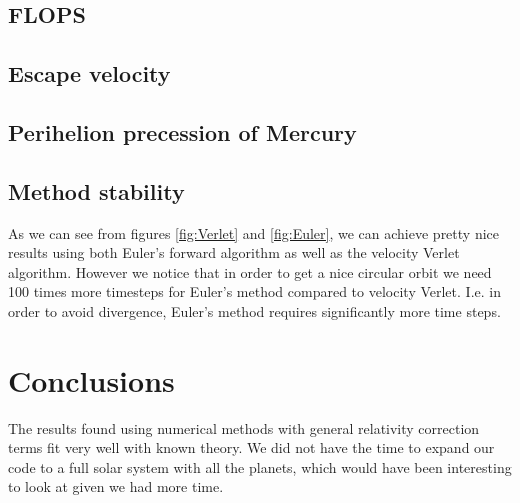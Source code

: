 \documentclass[a4paper, fontsize=11pt]{article}
\begin{document}
\cite{H-Jensen}

\subsection{FLOPS}




\subsection{Escape velocity}






\subsection{Perihelion precession of Mercury}




\subsection{Method stability} 




As we can see from figures \ref{fig:Verlet} and \ref{fig:Euler}, we can achieve pretty nice results using both Euler's forward algorithm as well as the velocity Verlet algorithm. However we notice that in order to get a nice circular orbit we need 100 times more timesteps for Euler's method compared to velocity Verlet. I.e. in order to avoid divergence, Euler's method requires significantly more time steps.



\section{Conclusions}

The results found using numerical methods with general relativity correction terms fit very well with known theory. We did not have the time to expand our code to a full solar system with all the planets, which would have been interesting to look at given we had more time.




\end{document}
